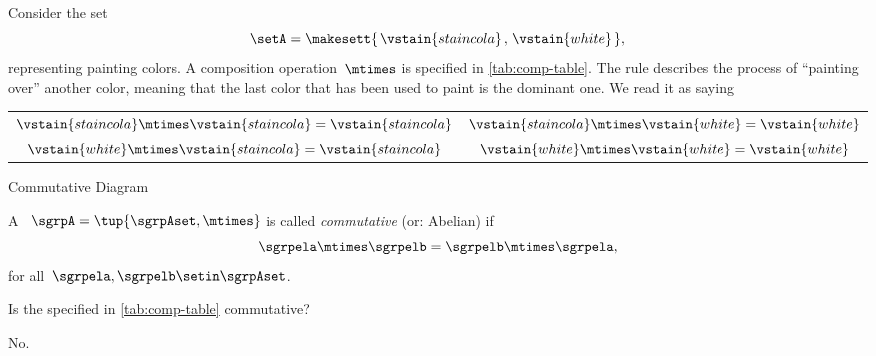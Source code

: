 \begin{example}
    Consider the set
    \begin{equation}
        \setA = \makesett{\hspace{0.05cm} \vstain{staincola}\hspace{0.05cm},\hspace{0.05cm} \vstain{white}\hspace{0.05cm}},
    \end{equation}
    representing painting colors.
    A composition operation~$\mtimes$ is specified in \cref{tab:comp-table}.
    The rule describes the process of ``painting over'' another color, meaning that the last color that has been used to paint is the dominant one.
    We read it as saying
    \begin{center}
        \setlength{\tabcolsep}{20pt}
        \begin{tabular}{cc}
            $\vstain{staincola} \mtimes \vstain{staincola} = \vstain{staincola}$ & $\vstain{staincola} \mtimes \vstain{white} = \vstain{white}$ \\
            $\vstain{white} \mtimes \vstain{staincola} = \vstain{staincola}$     & $\vstain{white} \mtimes \vstain{white} = \vstain{white}$
        \end{tabular}
    \end{center}
\end{example}

\begin{marginfigure}
    \centering
    \caption{Commutative Diagram}
    \label{fig:magma-diagram}
\end{marginfigure}

\begin{definition}
    \label{def:magma-commutativity}
    A ~$\sgrpA = \tup{\sgrpAset, \mtimes}$ is called \emph{commutative} (or: Abelian) if
    \begin{equation}
        \label{eq:semigroup-commutativity}
        \sgrpela \mtimes \sgrpelb = \sgrpelb \mtimes \sgrpela,
    \end{equation}
    for all~$\sgrpela, \sgrpelb \setin \sgrpAset$.
\end{definition}


\begin{exercise}
    Is the  specified in \cref{tab:comp-table} commutative?
\end{exercise}
\begin{solution}
    No.
\end{solution}

